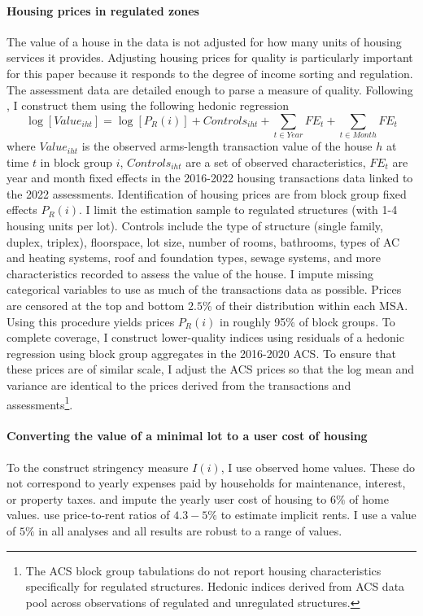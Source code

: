 \documentclass[12pt]{article}
\begin{document}
\paragraph*{Housing prices in regulated zones} The value of a house in the data is not adjusted for how many units of housing services it provides. Adjusting housing prices for quality is particularly important for this paper because it responds to the degree of income sorting and regulation. The assessment data are detailed enough to parse a measure of quality. Following \cite{BSH}, I construct them using the following hedonic regression
\begin{equation}\label{hedonicIndex}
	\log[Value_{iht}] = \log[P_{R}(i)] + Controls_{iht} + \sum_{t \in Year}FE_{t} + \sum_{t \in Month}FE_{t}
\end{equation} 
where $Value_{iht}$ is the observed arms-length transaction value of the house $h$ at time $t$ in block group $i$, $Controls_{iht}$ are a set of observed characteristics, $FE_{t}$ are year and month fixed effects in the 2016-2022 housing transactions data linked to the 2022 assessments. Identification of housing prices are from block group fixed effects $P_{R}(i)$. I limit the estimation sample to regulated structures (with 1-4 housing units per lot). Controls include the type of structure (single family, duplex, triplex), floorspace, lot size, number of rooms, bathrooms, types of AC and heating systems, roof and foundation types, sewage systems, and more characteristics recorded to assess the value of the house. I impute missing categorical variables to use as much of the transactions data as possible. Prices are censored at the top and bottom $2.5\%$ of their distribution within each MSA. Using this procedure yields prices $P_{R}(i)$ in roughly 95\% of block groups. To complete coverage, I construct lower-quality indices using residuals of a hedonic regression using block group aggregates in the 2016-2020 ACS. To ensure that these prices are of similar scale, I adjust the ACS prices so that the log mean and variance are identical to the prices derived from the transactions and assessments\footnote{The ACS block group tabulations do not report housing characteristics specifically for regulated structures. Hedonic indices derived from ACS data pool across observations of regulated and unregulated structures.}.

\paragraph*{Converting the value of a minimal lot to a user cost of housing} To the construct stringency measure $I(i)$, I use observed home values. These do not correspond to yearly expenses paid by households for maintenance, interest, or property taxes. \cite{AttanasioPistaferri} and \cite{straub2019} impute the yearly user cost of housing to $6\%$ of home values. \cite{Coutureetal} use price-to-rent ratios of $4.3 - 5\%$ to estimate implicit rents. I use a value of $5\%$ in all analyses and all results are robust to a range of values.  
\end{document}
